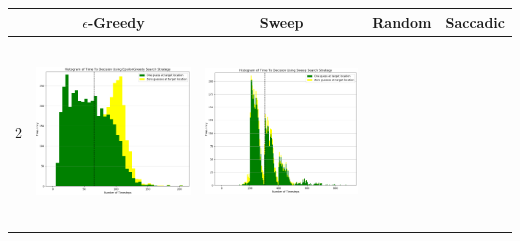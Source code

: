 \begin{landscape}
\begin{table}[h!]
  \centering
  \begin{tabular}{ | c | c | c | c | c |}
    \hline
    & $\epsilon$-Greedy & Sweep & Random & Saccadic \\
    \hline
    2 & 
    \begin{minipage}[c][52mm][c]{49mm}
      \includegraphics[width=49mm, height=49mm]{Chapters/MultiAgentTargetDetection/Figs/Histograms/MultipleAgent/2/SingleAgentSingleSource2EpsilonGreedyHistogram.png}
    \end{minipage}
    &
    \begin{minipage}[c][52mm][c]{49mm}
      \includegraphics[width=49mm, height=49mm]{Chapters/MultiAgentTargetDetection/Figs/Histograms/MultipleAgent/2/SingleAgentSingleSource2SweepHistogram.png}


\end{minipage}
\end{tabular}
\end{table}
\end{landscape}
